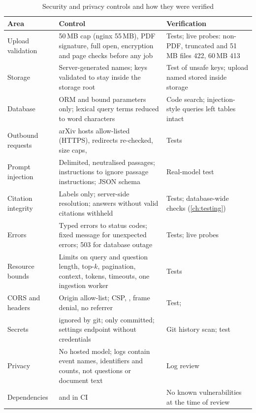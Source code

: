 \begin{table}[htbp]
  \centering
  \caption{Security and privacy controls and how they were verified}\label{tab:controls}
  {\small
  \begin{tabularx}{\textwidth}{@{}lLL@{}}
    \toprule
    \textbf{Area} & \textbf{Control} & \textbf{Verification} \\
    \midrule
    Upload validation & 50\,MB cap (nginx 55\,MB), PDF signature, full open, encryption and page checks before any job & Tests; live probes: non-PDF, truncated and 51\,MB files 422, 60\,MB 413 \\
    Storage & Server-generated  names; keys validated to stay inside the storage root & Test of unsafe keys; upload named  stored inside storage \\
    Database & ORM and bound parameters only; lexical query terms reduced to word characters & Code search; injection-style queries left tables intact \\
    Outbound requests & arXiv hosts allow-listed (HTTPS), redirects re-checked, size caps,  & Tests \\
    Prompt injection & Delimited, neutralised passages; instructions to ignore passage instructions; JSON schema & Real-model test \\
    Citation integrity & Labels only; server-side resolution; answers without valid citations withheld & Tests; database-wide checks (\autoref{ch:testing}) \\
    Errors & Typed errors to status codes; fixed message for unexpected errors; 503 for database outage & Tests; live probes \\
    Resource bounds & Limits on query and question length, top-$k$, pagination, context, tokens, timeouts, one ingestion worker & Tests \\
    CORS and headers & Origin allow-list; CSP, , frame denial, no referrer & Test;  \\
    Secrets &  ignored by git; only  committed; settings endpoint without credentials & Git history scan; test \\
    Privacy & No hosted model; logs contain event names, identifiers and counts, not questions or document text & Log review \\
    Dependencies &  and  in CI & No known vulnerabilities at the time of review \\
    \bottomrule
  \end{tabularx}
  }
\end{table}

